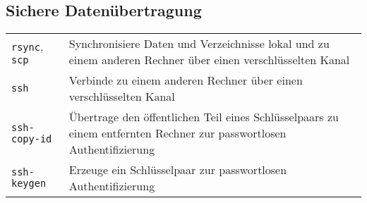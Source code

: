 \documentclass[10pt,a4paper]{article}
\begin{document}
\begin{multicols}{2}
\section{Sichere Datenübertragung}
\begin{tabular}{ p{2.5cm} p{8.5cm} }
  \hline
  \texttt{rsync}, \texttt{scp} & Synchronisiere Daten und Verzeichnisse lokal und zu einem anderen Rechner über einen verschlüsselten Kanal \\
  \rowcolor{Gray}
  \texttt{ssh} & Verbinde zu einem anderen Rechner über einen verschlüsselten Kanal\\
  \texttt{ssh-copy-id} & Übertrage den öffentlichen Teil eines Schlüsselpaars zu einem entfernten Rechner zur passwortlosen Authentifizierung\\
  \rowcolor{Gray}
  \texttt{ssh-keygen} & Erzeuge ein Schlüsselpaar zur passwortlosen Authentifizierung\\
  \hline
\end{tabular}


\columnbreak


\end{multicols}
\end{document}
